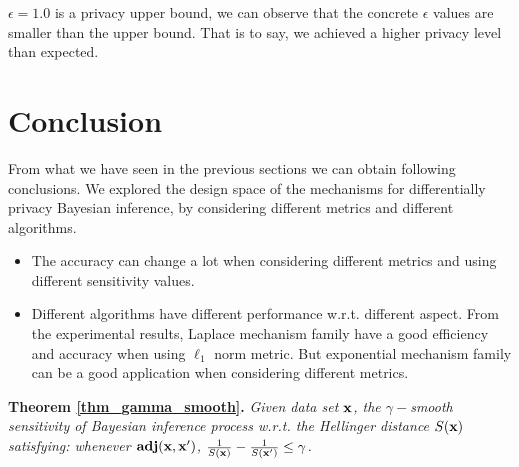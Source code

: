 \documentclass{article}
\begin{document}
$\epsilon = 1.0$ is a privacy upper bound, we can observe that the concrete $\epsilon$ values are smaller than the upper bound. That is to say, we achieved a higher privacy level than expected. 



\section{Conclusion}
From what we have seen in the previous sections we can obtain following conclusions. We explored the design space of the mechanisms for differentially privacy Bayesian inference, by considering different metrics and different algorithms.
\begin{itemize}
  \item The accuracy can change a lot when considering different metrics and using different sensitivity values.
  \item Different algorithms have different performance w.r.t. different aspect. From the experimental results, Laplace mechanism family have a good efficiency and accuracy when using $\ell_1$ norm metric. But exponential mechanism family can be a good application when considering different metrics.
\end{itemize}






\appendix

\noindent \textbf{Theorem \ref{thm_gamma_smooth}.}
\emph{
Given data set $\textbf{x}$, the $\gamma -$smooth sensitivity of Bayesian inference process w.r.t. the Hellinger distance $S(\textbf{x})$ satisfying:%
whenever $\textbf{adj}(\textbf{x},\textbf{x}')$, 
$\frac{1}{S(\textbf{x})} - \frac{1}{S(\textbf{x}')} \leq \gamma$.
}
\end{document}
